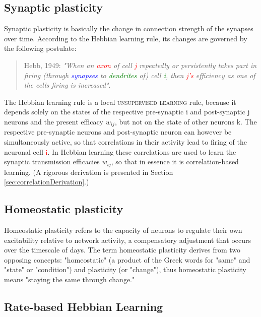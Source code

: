 \documentclass[11pt]{article}
\begin{document}
\subsection{Synaptic plasticity}
Synaptic plasticity is basically the change in connection strength of the synapses over time. According to the Hebbian learning rule, its changes are governed by the following postulate:
\begin{quote}{Hebb, 1949:}
\textit{"When an \textcolor{red}{axon} of cell \textcolor{red}{j} repeatedly or persistently takes part in firing (through \textcolor{blue}{synapses} to \textcolor{green}{dendrites} of) cell \textcolor{green}{i}, then \textcolor{red}{j's} efficiency as one of the cells firing is increased"}.
\end{quote}
The Hebbian learning rule is a local \textsc{unsupervised learning} rule, because it depends solely on the states of the respective pre-synaptic i and post-synaptic j neurons and the present efficacy $w_{ij}$, but not on the state of other neurons k. The respective pre-synaptic neurons and post-synaptic neuron can however be simultaneously active, so that correlations in their activity lead to firing of the neuronal cell \textcolor{red}{i}. In Hebbian learning these correlations are used to learn the synaptic transmission efficacies $w_{ij}$, so that in essence it is correlation-based learning. (A rigorous derivation is presented in Section \ref{sec:correlationDerivation}.)

\subsection{Homeostatic plasticity}
Homeostatic plasticity refers to the capacity of neurons to regulate their own excitability relative to network activity, a compensatory adjustment that occurs over the timescale of days. The term homeostatic plasticity derives from two opposing concepts: "homeostatic" (a product of the Greek words for "same" and "state" or "condition") and plasticity (or "change"), thus homeostatic plasticity means "staying the same through change."

\subsection{Rate-based Hebbian Learning}
\end{document}
